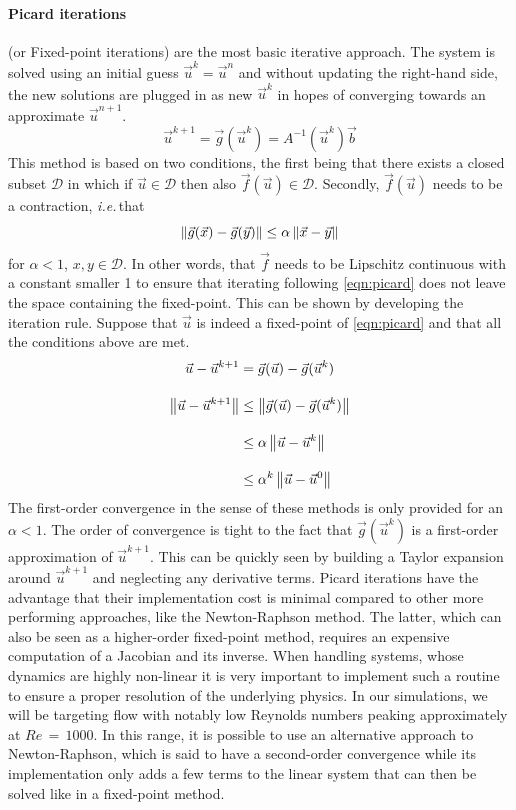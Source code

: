 \paragraph{Picard iterations} (or Fixed-point iterations) are the most basic iterative approach. The system is solved using an initial guess $\vec{u}^k = \vec{u}^n$ and without updating the right-hand side, the new solutions are plugged in as new $\vec{u}^k$ in hopes of converging towards an approximate $\vec{u}^{n+1}$.
\begin{equation}
	\vec{u}^{k+1} = \vec{g}(\vec{u}^{k}) = A^{-1}(\vec{u}^{k})\vec{b}
	\label{eqn:picard}
\end{equation}
This method is based on two conditions, the first being that there exists a closed subset $\mathcal{D}$ in which if $\vec{u}\in\mathcal{D}$ then also $\vec{f}(\vec{u})\in\mathcal{D}$. Secondly, $\vec{f}(\vec{u})$ needs to be a contraction, \textit{i.e.}\,that
\begin{equation*}
	\left\lVert\vec{g}(\vec{x}) - \vec{g}(\vec{y})\right\rVert \leq \alpha \left\lVert\vec{x}-\vec{y}\right\rVert
\end{equation*}
for $\alpha<1$, $x,y\in\mathcal{D}$. In other words, that $\vec{f}$ needs to be Lipschitz continuous with a constant smaller 1 to ensure that iterating following \autoref{eqn:picard} does not leave the space containing the fixed-point. This can be shown by developing the iteration rule. Suppose that $\vec{u}$ is indeed a fixed-point of \autoref{eqn:picard} and that all the conditions above are met.
\begin{equation*}
	\begin{split}
		\vec{u} - \vec{u}^{k+1} &= \vec{g}(\vec{u}) - \vec{g}(\vec{u}^{k})\\[1em]
		\left\lVert\vec{u} - \vec{u}^{k+1}\right\rVert &\leq \left\lVert\vec{g}(\vec{u}) - \vec{g}(\vec{u}^{k})\right\rVert\\[1em]
		&\leq \alpha \left\lVert\vec{u} - \vec{u}^{k}\right\rVert\\[1em]
		&\leq \alpha^k \left\lVert\vec{u} - \vec{u}^{0}\right\rVert\\
	\end{split}
\end{equation*}
The first-order convergence in the sense of these methods is only provided for an $\alpha<1$. The order of convergence is tight to the fact that $\vec{g}(\vec{u}^{k})$ is a first-order approximation of $\vec{u}^{k+1}$. This can be quickly seen by building a Taylor expansion around $\vec{u}^{k+1}$ and neglecting any derivative terms. Picard iterations have the advantage that their implementation cost is minimal compared to other more performing approaches, like the Newton-Raphson method. The latter, which can also be seen as a higher-order fixed-point method, requires an expensive computation of a Jacobian and its inverse. When handling systems, whose dynamics are highly non-linear it is very important to implement such a routine to ensure a proper resolution of the underlying physics. In our simulations, we will be targeting flow with notably low Reynolds numbers peaking approximately at $Re\,=\,1000$. In this range, it is possible to use an alternative approach to Newton-Raphson, which is said to have a second-order convergence while its implementation only adds a few terms to the linear system that can then be solved like in a fixed-point method.

